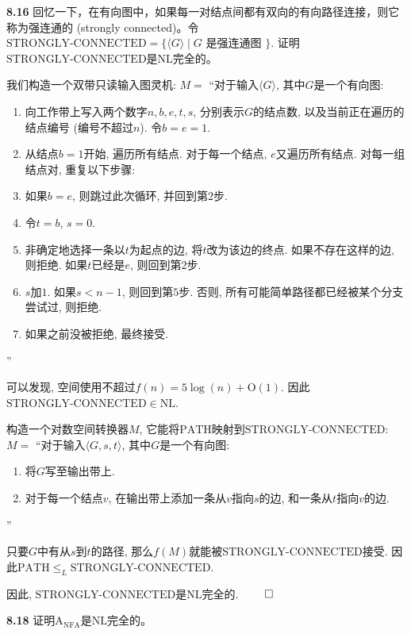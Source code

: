 \documentclass[UTF8]{report}
\newcommand{\problem}[1]{{\setlength{\parskip}{10pt}\noindent \bf{#1}}}
\renewenvironment{proof}{{\setlength{\parskip}{7pt}\noindent\hskip 2em \bf 证明 \quad}}{\hfill$\qed$\par}
\newcommand{\NFA}{\mathrm{NFA}}
\renewcommand{\O}{\mathrm{O}}
\newcommand{\NL}{\mathrm{NL}}
\newcommand{\STCN}{\mathrm{STRONGLY\text{-}CONNECTED}}
\newcommand{\PATH}{\mathrm{PATH}}
\newcommand{\A}{\mathrm{A}}
\begin{document}
\problem{8.16} 回忆一下，在有向图中，如果每一对结点间都有双向的有向路径连接，则它称为强连通的 (strongly connected)。令$\STCN = \{ \langle G \rangle \mid G \text{ 是强连通图 }\}$. 证明$\STCN$是$\NL$完全的。

\begin{proof}
    我们构造一个双带只读输入图灵机: $M =$ ``对于输入$\langle G \rangle$, 其中$G$是一个有向图:
    \begin{enumerate}
        \item 向工作带上写入两个数字$n, b, e, t, s$, 分别表示$G$的结点数, 以及当前正在遍历的结点编号 (编号不超过$n$). 令$b=e=1$.
        \item 从结点$b=1$开始, 遍历所有结点. 对于每一个结点, $e$又遍历所有结点. 对每一组结点对, 重复以下步骤:
        \item 如果$b=e$, 则跳过此次循环, 并回到第$2$步.
        \item 令$t=b$, $s=0$. 
        \item 非确定地选择一条以$t$为起点的边, 将$t$改为该边的终点. 如果不存在这样的边, 则拒绝. 如果$t$已经是$e$, 则回到第$2$步.
        \item $s$加$1$. 如果$s<n-1$, 则回到第$5$步. 否则, 所有可能简单路径都已经被某个分支尝试过, 则拒绝.
        \item 如果之前没被拒绝, 最终接受.
    \end{enumerate}
    ''

    可以发现, 空间使用不超过$f(n) = 5\log(n) + \O(1)$. 因此$\STCN \in \NL$.

    构造一个对数空间转换器$M$, 它能将$\PATH$映射到$\STCN$: $M =$ ``对于输入$\langle G, s, t \rangle$, 其中$G$是一个有向图:
    \begin{enumerate}
        \item 将$G$写至输出带上.
        \item 对于每一个结点$v$, 在输出带上添加一条从$v$指向$s$的边, 和一条从$t$指向$v$的边.
    \end{enumerate}
    ''

    只要$G$中有从$s$到$t$的路径, 那么$f(M)$就能被$\STCN$接受. 因此$\PATH \leq_L \STCN$.

    因此, $\STCN$是$\NL$完全的.
\end{proof}


\problem{8.18} 证明$\A_{\NFA}$是$\NL$完全的。
\end{document}
